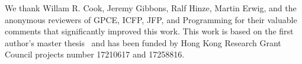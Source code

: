 \documentclass[english]{programming}
\begin{document}












\acks We thank Willam R. Cook, Jeremy Gibbons, Ralf Hinze, Martin Erwig, and the
anonymous reviewers of GPCE, ICFP, JFP, and Programming for their valuable
comments that significantly improved this work. This work is based on the first
author's master thesis~\cite{zhang2017extensible} and has been funded by Hong
Kong Research Grant Council projects number 17210617 and 17258816.



\end{document}
